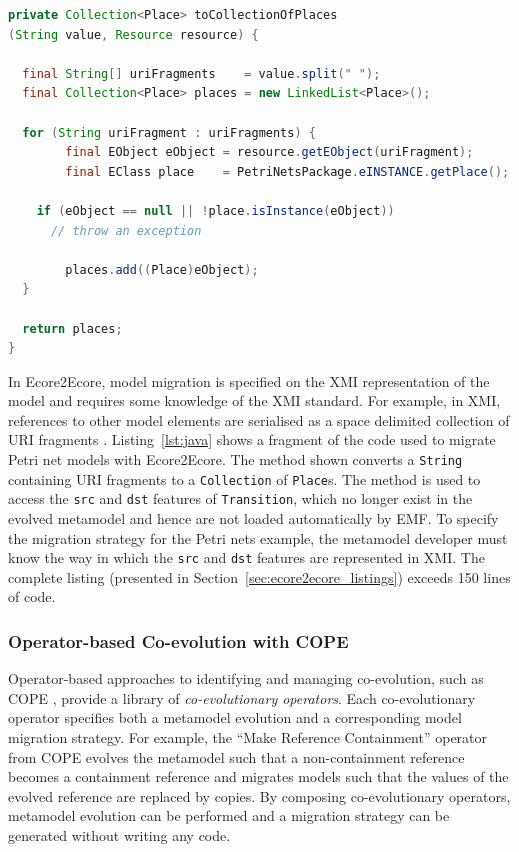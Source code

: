 \begin{lstlisting}[float=tbp, caption=Java method for deserialising a reference., label=lst:java, language=Java]
private Collection<Place> toCollectionOfPlaces
(String value, Resource resource) {

  final String[] uriFragments    = value.split(" ");
  final Collection<Place> places = new LinkedList<Place>();
 
  for (String uriFragment : uriFragments) {
		final EObject eObject = resource.getEObject(uriFragment);
		final EClass place    = PetriNetsPackage.eINSTANCE.getPlace();

    if (eObject == null || !place.isInstance(eObject))
      // throw an exception
						
		places.add((Place)eObject);
  }
 
  return places;
}
\end{lstlisting}

In Ecore2Ecore, model migration is specified on the XMI representation of the model and requires some knowledge of the XMI standard. For example, in XMI, references to other model elements are serialised as a space delimited collection of URI fragments \cite{steinberg09emf}. Listing~\ref{lst:java} shows a fragment of the code used to migrate Petri net models with Ecore2Ecore. The method shown converts a \texttt{String} containing URI fragments to a \texttt{Collection} of \texttt{Place}s. The method is used to access the \texttt{src} and \texttt{dst} features of \texttt{Tr\-an\-si\-ti\-on}, which no longer exist in the evolved metamodel and hence are not loaded automatically by EMF. To specify the migration strategy for the Petri nets example, the metamodel developer must know the way in which the \texttt{src} and \texttt{dst} features are represented in XMI. The complete listing (presented in Section~\ref{sec:ecore2ecore_listings}) exceeds 150 lines of code.

\subsubsection{Operator-based Co-evolution with COPE}
\label{subsubsec:cope}

Operator-based approaches to identifying and managing co-evolution, such as COPE \cite{herrmannsdoerfer09cope}, provide a library of \emph{co-evolutionary operators}. Each co-evolutionary operator specifies both a metamodel evolution and a corresponding model migration strategy. For example, the ``Make Reference Containment'' operator from COPE evolves the metamodel such that a non-containment reference becomes a containment reference and migrates models such that the values of the evolved reference are replaced by copies. By composing co-evolutionary operators, metamodel evolution can be performed and a migration strategy can be generated without writing any code.

